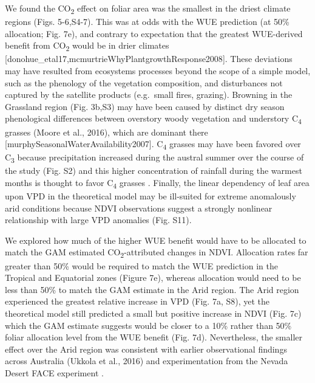 \documentclass[gc, manuscript]{copernicus}
\begin{document}
We found the CO\textsubscript{2} effect on foliar area was the smallest
in the driest climate regions (Figs. 5-6,S4-7). This was at odds with
the WUE prediction (at 50\% allocation; Fig. 7e), and contrary to
expectation that the greatest WUE-derived benefit from
CO\textsubscript{2} would be in drier climates
{[}donohue\_etal17,mcmurtrieWhyPlantgrowthResponse2008{]}. These
deviations may have resulted from ecosystems processes beyond the scope
of a simple model, such as the phenology of the vegetation composition,
and disturbances not captured by the satellite products (e.g.~small
fires, grazing). Browning in the Grassland region (Fig. 3b,S3) may have
been caused by distinct dry season phenological differences between
overstory woody vegetation and understory C\textsubscript{4} grasses
\citep{mooreReviewsSynthesesAustralian2016}(Moore et al., 2016), which
are dominant there {[}murphySeasonalWaterAvailability2007{]}.
C\textsubscript{4} grasses may have been favored over C\textsubscript{3}
because precipitation increased during the austral summer over the
course of the study (Fig. S2) and this higher concentration of rainfall
during the warmest months is thought to favor C\textsubscript{4} grasses
\citep{hattersleyDistributionC3C41983a, knappResolvingDustBowl2020, murphySeasonalWaterAvailability2007}.
Finally, the linear dependency of leaf area upon VPD in the theoretical
model may be ill-suited for extreme anomalously arid conditions because
NDVI observations suggest a strongly nonlinear relationship with large
VPD anomalies (Fig. S11).

We explored how much of the higher WUE benefit would have to be
allocated to match the GAM estimated CO\textsubscript{2}-attributed
changes in NDVI. Allocation rates far greater than 50\% would be
required to match the WUE prediction in the Tropical and Equatorial
zones (Figure 7e), whereas allocation would need to be less than 50\% to
match the GAM estimate in the Arid region. The Arid region experienced
the greatest relative increase in VPD (Fig. 7a, S8), yet the theoretical
model still predicted a small but positive increase in NDVI (Fig. 7c)
which the GAM estimate suggests would be closer to a 10\% rather than
50\% foliar allocation level from the WUE benefit (Fig. 7d).
Nevertheless, the smaller effect over the Arid region was consistent
with earlier observational findings across Australia
\citep{ukkolaReducedStreamflowWaterstressed2016b}(Ukkola et al., 2016)
and experimentation from the Nevada Desert FACE experiment
\citep{smithLongtermResponseMojave2014}.
\end{document}
